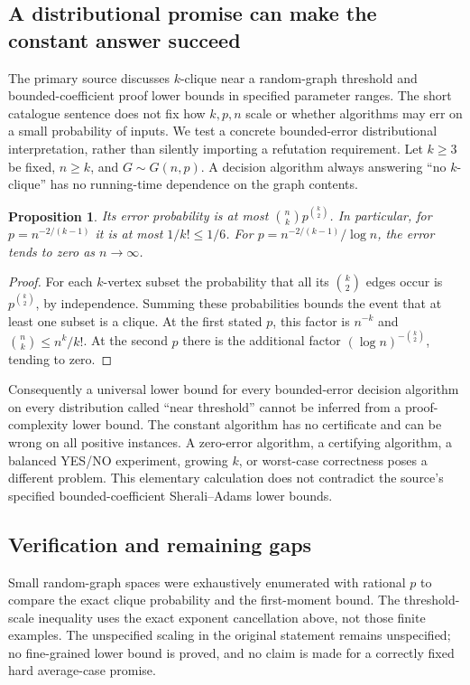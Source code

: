 \documentclass[11pt]{article}
\newtheorem{proposition}{Proposition}
\begin{document}
\subsection{A distributional promise can make the constant answer succeed}
The primary source discusses $k$-clique near a random-graph threshold and bounded-coefficient proof lower bounds in specified parameter ranges. The short catalogue sentence does not fix how $k,p,n$ scale or whether algorithms may err on a small probability of inputs. We test a concrete bounded-error distributional interpretation, rather than silently importing a refutation requirement.
Let $k\ge3$ be fixed, $n\ge k$, and $G\sim G(n,p)$. A decision algorithm always answering ``no $k$-clique'' has no running-time dependence on the graph contents.
\begin{proposition}
Its error probability is at most $\binom nk p^{\binom k2}$. In particular, for $p=n^{-2/(k-1)}$ it is at most $1/k!\le1/6$. For $p=n^{-2/(k-1)}/\log n$, the error tends to zero as $n\to\infty$.
\end{proposition}
\begin{proof}
For each $k$-vertex subset the probability that all its $\binom k2$ edges occur is $p^{\binom k2}$, by independence. Summing these probabilities bounds the event that at least one subset is a clique. At the first stated $p$, this factor is $n^{-k}$ and $\binom nk\le n^k/k!$. At the second $p$ there is the additional factor $(\log n)^{-\binom k2}$, tending to zero.
\end{proof}
Consequently a universal lower bound for every bounded-error decision algorithm on every distribution called ``near threshold'' cannot be inferred from a proof-complexity lower bound. The constant algorithm has no certificate and can be wrong on all positive instances. A zero-error algorithm, a certifying algorithm, a balanced YES/NO experiment, growing $k$, or worst-case correctness poses a different problem. This elementary calculation does not contradict the source's specified bounded-coefficient Sherali--Adams lower bounds.
\subsection{Verification and remaining gaps}
Small random-graph spaces were exhaustively enumerated with rational $p$ to compare the exact clique probability and the first-moment bound. The threshold-scale inequality uses the exact exponent cancellation above, not those finite examples. The unspecified scaling in the original statement remains unspecified; no fine-grained lower bound is proved, and no claim is made for a correctly fixed hard average-case promise.
\end{document}
